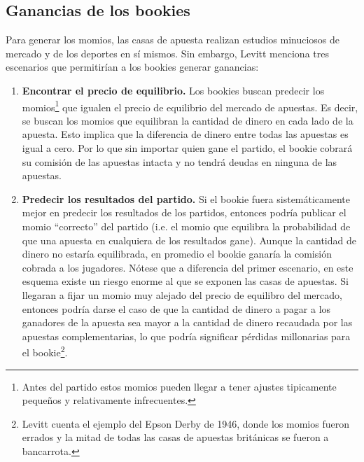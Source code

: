  \subsection{Ganancias de los bookies}

Para generar los momios, las casas de apuesta realizan estudios minuciosos de mercado y de los deportes en sí mismos. Sin embargo, Levitt \cite{levitt2004gambling} menciona tres escenarios que permitirían a los bookies generar ganancias:
\begin{enumerate}
	\item \textbf{Encontrar el precio de equilibrio.} Los bookies buscan predecir los momios\footnote{Antes del partido estos momios pueden llegar a tener ajustes tipicamente pequeños y relativamente infrecuentes.} que igualen el precio de equilibrio del mercado de apuestas. Es decir, se buscan los momios que equilibran la cantidad de dinero en cada lado de la apuesta. Esto implica que la diferencia de dinero entre todas las apuestas es igual a cero. Por lo que sin importar quien gane el partido, el bookie cobrará su comisión de las apuestas intacta y no tendrá deudas en ninguna de las apuestas.
	
	\item \textbf{Predecir los resultados del partido.} Si el bookie fuera sistemáticamente mejor en predecir los resultados de los partidos, entonces podría publicar el momio ``correcto'' del partido (i.e. el momio que equilibra la probabilidad de que una apuesta en cualquiera de los resultados gane). Aunque la cantidad de dinero no estaría equilibrada, en promedio el bookie ganaría la comisión cobrada a los jugadores. Nótese que a diferencia del primer escenario, en este esquema existe un riesgo enorme al que se exponen las casas de apuestas. Si llegaran a fijar un momio muy alejado del precio de equilibro del mercado, entonces podría darse el caso de que la cantidad de dinero a pagar a los ganadores de la apuesta sea mayor a la cantidad de dinero recaudada por las apuestas complementarias, lo que podría significar pérdidas millonarias para el bookie\footnote{Levitt \cite{levitt2004gambling} cuenta el ejemplo del Epson Derby de 1946, donde los momios fueron errados y la mitad de todas las casas de apuestas británicas se fueron a bancarrota.}.
	

\end{enumerate}
